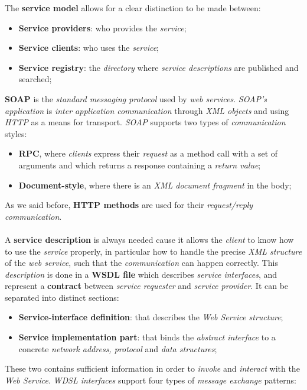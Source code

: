 \documentclass{article}
\begin{document}
The \textbf{service model} allows for a clear distinction to be made between:
\begin{itemize}
\item \textbf{Service providers}: who provides the \emph{service};
\item \textbf{Service clients}: who uses the \emph{service};
\item \textbf{Service registry}: the \emph{directory} where \emph{service descriptions} are published and searched;
\end{itemize}
\textbf{SOAP} is the \emph{standard messaging protocol} used by \emph{web services}. \emph{SOAP's application} is \emph{inter application communication} through \emph{XML objects} and using \emph{HTTP} as a means for transport. \emph{SOAP} supports two types of \emph{communication} styles:
\begin{itemize}
\item \textbf{RPC}, where \emph{clients} express their \emph{request} as a method call with a set of arguments and which returns a response containing a \emph{return value};
\item \textbf{Document-style}, where there is an \emph{XML document fragment} in the body;
\end{itemize}
As we said before, \textbf{HTTP methods} are used for their \emph{request/reply communication}. \\\\
A \textbf{service description} is always needed cause it allows the \emph{client} to know how to use the \emph{service} properly, in particular how to handle the precise\emph{ XML structure} of the \emph{web service}, such that the \emph{communication} can happen correctly. This \emph{description} is done in a \textbf{WSDL file} which describes \emph{service interfaces}, and represent a \textbf{contract} between \emph{service requester} and \emph{service provider}. It can be separated into distinct sections:
\begin{itemize}
\item \textbf{Service-interface definition}: that describes the \emph{Web Service structure};
\item \textbf{Service implementation part}: that binds the \emph{abstract interface} to a concrete \emph{network address, protocol} and \emph{data structures};
\end{itemize}
These two contains sufficient information in order to \emph{invoke} and \emph{interact} with the \emph{Web Service}. \emph{WDSL interfaces} support four types of \emph{message exchange} patterns: 
\end{document}
